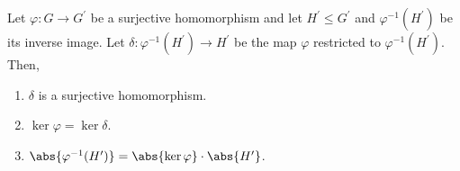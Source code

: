 \begin{prop} \label{prop:restriction-homo}
Let $\varphi \colon G \to G^{\prime}$ be a surjective homomorphism and let $H^{\prime} \leq G^{\prime}$ and $\varphi^{-1}(H^{\prime})$ be its inverse image. Let $\delta \colon \varphi^{-1}(H^{\prime}) \to H^{\prime}$ be the map $\varphi$ restricted to $\varphi^{-1}(H^{\prime})$. Then,
\begin{enumerate}
    \item $\delta$ is a surjective homomorphism.
    \item $\ker\varphi = \ker\delta$.
    \item $\abs{\varphi^{-1}(H^{\prime})} = \abs{\ker\varphi} \cdot \abs{H^{\prime}}$.
\end{enumerate}
\end{prop}

